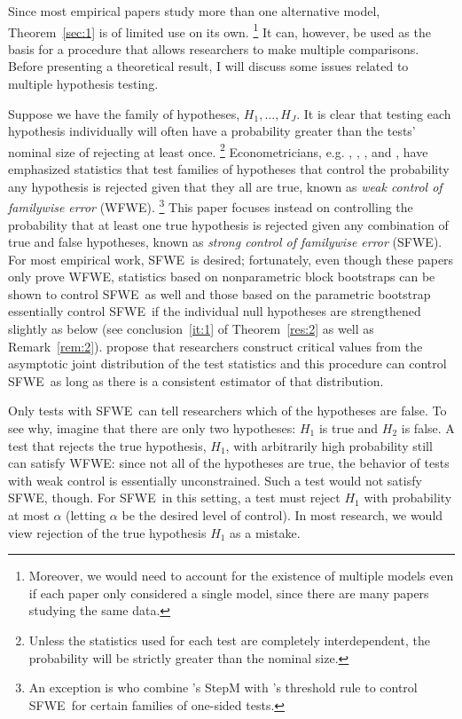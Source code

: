\documentclass[12pt,fleqn]{article}
\newcommand\citepos[2][]{\citeauthor{#2}'s \citeyearpar[#1]{#2}}
\theoremstyle{definition}
\newcommand{\sfwe}{SFWE}
\newcommand{\wfwe}{WFWE}
\begin{document}
Since most empirical papers study more than one alternative model,
Theorem~\ref{sec:1} is of limited use on its own.%
\footnote{Moreover,
  we would need to account for the existence of multiple models even if
each paper only considered a single model, since there are many papers
studying the same data.} %
It can, however, be
used as the basis for a procedure that allows researchers to make
multiple comparisons.  Before presenting a theoretical result, I will
discuss some issues related to multiple hypothesis testing.

Suppose we have the family of hypotheses, $H_1,\dots,H_J$.  It is
clear that testing each hypothesis individually will often have a
probability greater than the tests' nominal size of rejecting at least
once.%
\footnote{Unless the statistics used for each test are completely
  interdependent, the probability will be strictly greater than the
  nominal size.} %
Econometricians, e.g. \citet{Whi:00},
\citet{Han:05}, \cite{HuW:10}, and \citet{ClM:12b}, have emphasized
statistics that test families of hypotheses that control the
probability any hypothesis is rejected given that they all are true,
known as \textit{weak control of familywise error}
(\wfwe).%
\footnote{An exception is \citet{HHK:10} who combine
  \citepos{RoW:05} StepM with \citepos{Han:05} threshold rule to
  control \sfwe\ for certain families of one-sided tests.} %
This paper
focuses instead on controlling the probability that at least one true
hypothesis is rejected given any combination of true and false
hypotheses, known as \textit{strong control of familywise error}
(\sfwe).  For most empirical work, \sfwe\ is desired; fortunately,
even though these papers only prove \wfwe, statistics based on
nonparametric block bootstraps \citep{Whi:00,Han:05} can be shown to
control \sfwe\ as well \citep[this follows directly from][]{RoW:05}
and those based on the parametric bootstrap \citep{ClM:12b} essentially
control \sfwe\ if the individual null hypotheses are strengthened
slightly as below (see conclusion~\ref{it:1} of Theorem~\ref{res:2} as
well as Remark~\ref{rem:2}).  \citet{HuW:10} propose that researchers
construct critical values from the asymptotic joint distribution of
the test statistics and this procedure can control \sfwe\ as long as there is a
consistent estimator of that distribution.

Only tests with \sfwe\ can tell researchers which of the hypotheses
are false.  To see why, imagine that there are only two hypotheses:
$H_1$ is true and $H_2$ is false.  A test that rejects the true
hypothesis, $H_1$, with arbitrarily high probability still can satisfy
\wfwe: since not all of the hypotheses are true, the behavior of tests
with weak control is essentially unconstrained.  Such a test would not
satisfy \sfwe, though.  For \sfwe\ in this setting, a test must reject
$H_1$ with probability at most $\alpha$ (letting $\alpha$ be the
desired level of control).  In most research, we would view rejection
of the true hypothesis $H_1$ as a mistake.
\end{document}
